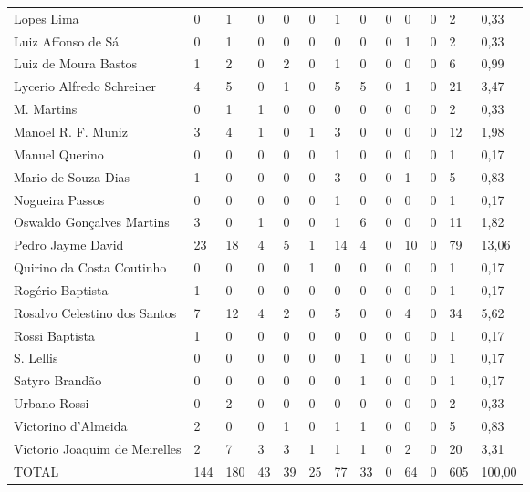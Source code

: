\begin{table}[!htp]
{\begin{tabular}{lllllllllllll}
Lopes Lima	&0	&1	&0	&0	&0	&1	&0	&0	&0	&0	&2	&0,33\\
Luiz Affonso de Sá	&0	&1	&0	&0	&0	&0	&0	&0	&1	&0	&2	&0,33\\
Luiz de Moura Bastos	&1	&2	&0	&2	&0	&1	&0	&0	&0	&0	&6	&0,99\\
Lycerio Alfredo Schreiner	&4	&5	&0	&1	&0	&5	&5	&0	&1	&0	&21	&3,47\\
M. Martins	&0	&1	&1	&0	&0	&0	&0	&0	&0	&0	&2	&0,33\\
Manoel R. F. Muniz	&3	&4	&1	&0	&1	&3	&0	&0	&0	&0	&12	&1,98\\
Manuel Querino	&0	&0	&0	&0	&0	&1	&0	&0	&0	&0	&1	&0,17\\
Mario de Souza Dias	&1	&0	&0	&0	&0	&3	&0	&0	&1	&0	&5	&0,83\\
Nogueira Passos	&0	&0	&0	&0	&0	&1	&0	&0	&0	&0	&1	&0,17\\
Oswaldo Gonçalves Martins	&3	&0	&1	&0	&0	&1	&6	&0	&0	&0	&11	&1,82\\
Pedro Jayme David	&23	&18	&4	&5	&1	&14	&4	&0	&10	&0	&79	&13,06\\
Quirino da Costa Coutinho	&0	&0	&0	&0	&1	&0	&0	&0	&0	&0	&1	&0,17\\
Rogério Baptista	&1	&0	&0	&0	&0	&0	&0	&0	&0	&0	&1	&0,17\\
Rosalvo Celestino dos Santos	&7	&12	&4	&2	&0	&5	&0	&0	&4	&0	&34	&5,62\\
Rossi Baptista	&1	&0	&0	&0	&0	&0	&0	&0	&0	&0	&1	&0,17\\
S. Lellis	&0	&0	&0	&0	&0	&0	&1	&0	&0	&0	&1	&0,17\\
Satyro Brandão	&0	&0	&0	&0	&0	&0	&1	&0	&0	&0	&1	&0,17\\
Urbano Rossi	&0	&2	&0	&0	&0	&0	&0	&0	&0	&0	&2	&0,33\\
Victorino d'Almeida	&2	&0	&0	&1	&0	&1	&1	&0	&0	&0	&5	&0,83\\
Victorio Joaquim de Meirelles	&2	&7	&3	&3	&1	&1	&1	&0	&2	&0	&20	&3,31\\
\midrule
TOTAL	&144	&180	&43	&39	&25	&77	&33	&0	&64	&0	&605	&100,00\\
\bottomrule
\end{tabular} 
}
{}
\end{table}

